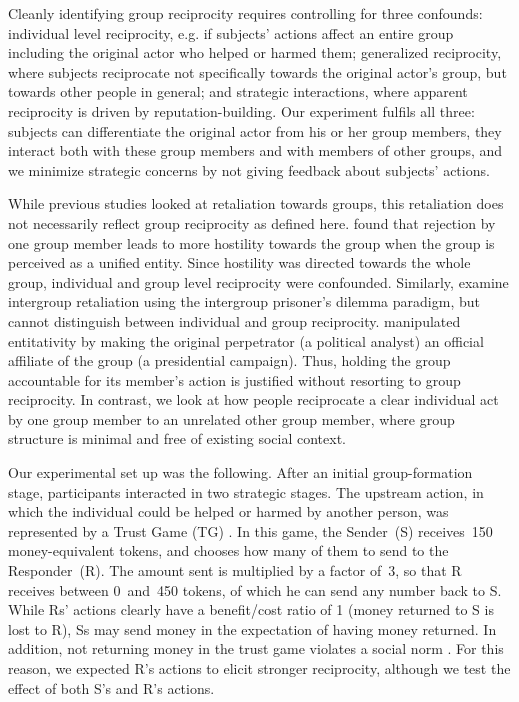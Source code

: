 \documentclass[12pt,a4paper]{article}\usepackage[]{graphicx}\usepackage[]{color}
\begin{document}
Cleanly identifying group reciprocity requires controlling for three confounds: individual level reciprocity, e.g. if
subjects' actions affect an entire group including the original actor who helped or harmed them; generalized reciprocity,
where subjects reciprocate not specifically towards the original actor’s group, but towards other people in general; and
strategic interactions, where apparent reciprocity is driven by reputation-building.
Our experiment fulfils all three: subjects can differentiate the original actor from his or her group members, they
interact both with these group members and with members of other groups, and we minimize strategic concerns by not giving
feedback about subjects' actions.

While previous studies looked at retaliation towards groups, this retaliation does not necessarily reflect group reciprocity as defined here. \citet{gaertner2008whenrejection} found that rejection by one group member leads to more hostility towards the group when the group is perceived as a unified entity. Since hostility was directed towards the whole group, individual and group level reciprocity were confounded. Similarly, \citet{bohm2016makes} examine intergroup retaliation using the intergroup prisoner's
dilemma paradigm, but cannot distinguish between individual and group reciprocity.
\citet{stenstrom2008theroles} manipulated entitativity by making the original perpetrator (a political analyst) an official affiliate of the group (a presidential campaign). Thus, holding the group accountable for its member's action is justified without resorting to group reciprocity. In contrast, we look at how people reciprocate a clear individual act by one group member to an unrelated other group member, where group structure is minimal and free of existing social context.


Our experimental set up was the following. After an initial group-formation stage, participants interacted in two strategic stages. The upstream action, in which the individual could be helped or harmed by another person, was represented by a Trust Game (TG) \citep{berg1995trust}.  In this game, the Sender~(S) receives~150 money-equivalent tokens, and chooses how many of them to send to the Responder~(R). The amount sent is multiplied by a factor of~3, so that R receives between 0~and~450 tokens, of which he can send any number back to S.  While
Rs' actions clearly have a benefit/cost ratio of 1 (money returned to S is lost to R), Ss may send money in the expectation of having
money returned. In addition, not returning money in the trust game violates a social norm \citep{kimbrough2015norms}. For
this reason, we expected R's actions to elicit stronger reciprocity, although we test the effect of both S's and R's actions.
\end{document}
